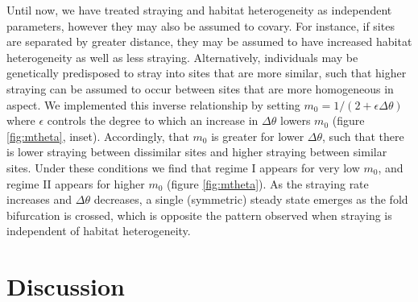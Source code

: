 \documentclass{revtex4}
\begin{document}
Until now, we have treated straying and habitat heterogeneity as independent parameters, however they may also be assumed to covary.
For instance, if sites are separated by greater distance, they may be assumed to have increased habitat heterogeneity as well as less straying.
Alternatively, individuals may be genetically predisposed to stray into sites that are more similar, such that higher straying can be assumed to occur between sites that are more homogeneous in aspect.
We implemented this inverse relationship by setting $m_0 = 1/(2+\epsilon\Delta\theta)$ where $\epsilon$ controls the degree to which an increase in $\Delta\theta$ lowers $m_0$ (figure \ref{fig:mtheta}, inset).
Accordingly, that $m_0$ is greater for lower $\Delta\theta$, such that there is lower straying between dissimilar sites and higher straying between similar sites.
Under these conditions we find that regime I appears for very low $m_0$, and regime II appears for higher $m_0$ (figure \ref{fig:mtheta}). %
As the straying rate increases and $\Delta\theta$ decreases, a single (symmetric) steady state emerges as the fold bifurcation is crossed, which is opposite the pattern observed when straying is independent of habitat heterogeneity.




\section{Discussion}
\end{document}
